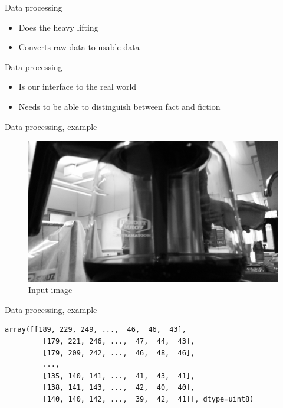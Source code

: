 \documentclass[presentation]{beamer}
\begin{document}
\begin{frame}[label={sec:org368bbef}]{Data processing}
\begin{itemize}
\item Does the heavy lifting
\item Converts raw data to usable data
\end{itemize}
\end{frame}
\begin{frame}[label={sec:orgf130f2d}]{Data processing}
\begin{itemize}
\item Is our interface to the real world
\item Needs to be able to distinguish between fact and fiction
\end{itemize}
\end{frame}
\begin{frame}[label={sec:orgbb14f24}]{Data processing, example}
\begin{figure}[htbp]
\centering
\includegraphics[width=.9\linewidth]{./figures/inputImage.png}
\caption{\label{fig:input-image}
Input image}
\end{figure}
\end{frame}
\begin{frame}[label={sec:org9cdae1f},fragile]{Data processing, example}
\begin{lstlisting}
array([[189, 229, 249, ...,  46,  46,  43],
         [179, 221, 246, ...,  47,  44,  43],
         [179, 209, 242, ...,  46,  48,  46],
         ...,
         [135, 140, 141, ...,  41,  43,  41],
         [138, 141, 143, ...,  42,  40,  40],
         [140, 140, 142, ...,  39,  42,  41]], dtype=uint8)
\end{lstlisting}
\end{frame}
\end{document}
